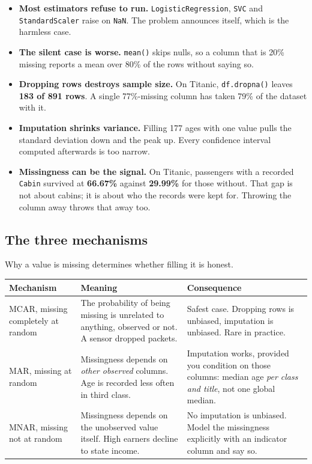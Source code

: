\documentclass[11pt,a4paper]{article}
\begin{document}
\begin{itemize}\itemsep3pt
  \item \textbf{Most estimators refuse to run.} \lstinline|LogisticRegression|,
        \lstinline|SVC| and \lstinline|StandardScaler| raise on \lstinline|NaN|. The
        problem announces itself, which is the harmless case.
  \item \textbf{The silent case is worse.} \lstinline|mean()| skips nulls, so a column that
        is 20\% missing reports a mean over 80\% of the rows without saying so.
  \item \textbf{Dropping rows destroys sample size.} On Titanic, \lstinline|df.dropna()|
        leaves \textbf{183 of 891 rows}. A single 77\%-missing column has taken 79\% of the
        dataset with it.
  \item \textbf{Imputation shrinks variance.} Filling 177 ages with one value pulls the
        standard deviation down and the peak up. Every confidence interval computed
        afterwards is too narrow.
  \item \textbf{Missingness can be the signal.} On Titanic, passengers with a recorded
        \texttt{Cabin} survived at \textbf{66.67\%} against \textbf{29.99\%} for those
        without. That gap is not about cabins; it is about who the records were kept for.
        Throwing the column away throws that away too.
\end{itemize}

\subsection{The three mechanisms}

Why a value is missing determines whether filling it is honest.

\begin{tabularx}{\textwidth}{@{}l X X@{}}
\toprule
\rowcolor{tablehead} \textbf{Mechanism} & \textbf{Meaning} & \textbf{Consequence} \\
\midrule
MCAR, missing completely at random & The probability of being missing is unrelated to anything, observed or not. A sensor dropped packets. & Safest case. Dropping rows is unbiased, imputation is unbiased. Rare in practice. \\
MAR, missing at random & Missingness depends on \emph{other observed} columns. Age is recorded less often in third class. & Imputation works, provided you condition on those columns: median age \emph{per class and title}, not one global median. \\
MNAR, missing not at random & Missingness depends on the unobserved value itself. High earners decline to state income. & No imputation is unbiased. Model the missingness explicitly with an indicator column and say so. \\
\bottomrule
\end{tabularx}
\end{document}
